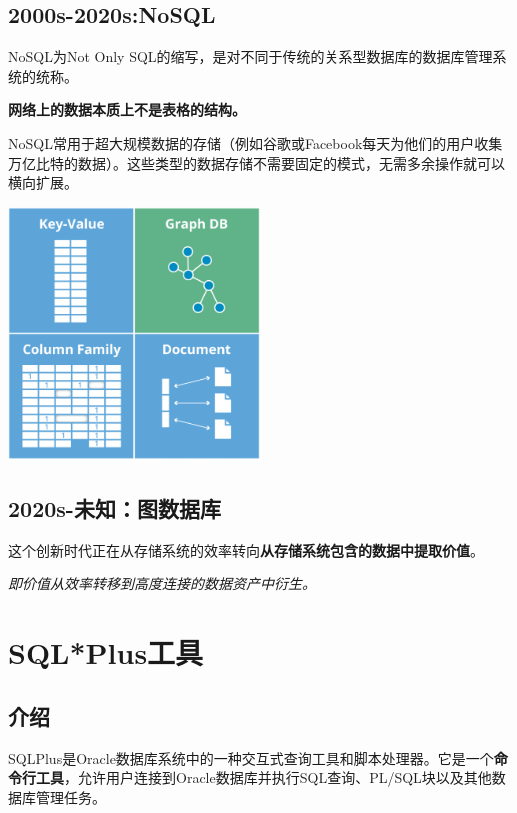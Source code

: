 \documentclass[11pt, a4paper, oneside, UTF8]{ctexbook}
\let\kaishu\relax %
\begin{document}
\subsection{2000s-2020s:NoSQL}
NoSQL为Not Only SQL的缩写，是对不同于传统的关系型数据库的数据库管理系统的统称。

\textbf{网络上的数据本质上不是表格的结构。}

NoSQL常用于超大规模数据的存储（例如谷歌或Facebook每天为他们的用户收集万亿比特的数据）。这些类型的数据存储不需要固定的模式，无需多余操作就可以横向扩展。

\begin{center}
  \begin{minipage}{\textwidth}
    \center
    \includegraphics[width=0.5\textwidth]{picture/NoSQL数据库示意图.png}
    \captionsetup{hypcap=false}
    \label{fig:NosqlDatabase}
  \end{minipage}
\end{center}

\subsection{2020s-未知：图数据库}
这个创新时代正在从存储系统的效率转向\textbf{从存储系统包含的数据中提取价值}。

\textit{即价值从效率转移到高度连接的数据资产中衍生。}

\section{SQL*Plus工具}
\subsection{介绍}
SQLPlus是Oracle数据库系统中的一种交互式查询工具和脚本处理器。它是一个{\bfseries\kaishu 命令行工具}，允许用户连接到Oracle数据库并执行SQL查询、PL/SQL块以及其他数据库管理任务。
\end{document}
